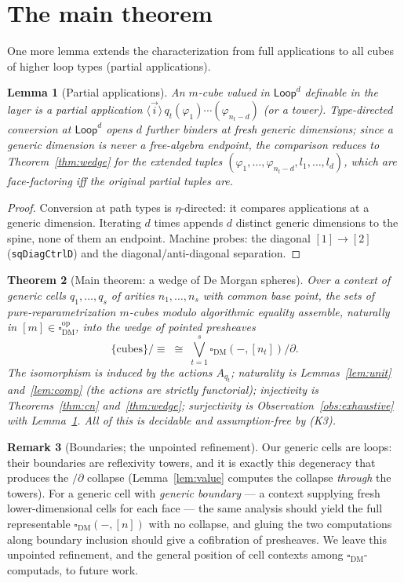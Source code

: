 \documentclass[11pt]{amsart}
\newtheorem{thm}{Theorem}[section]
\newtheorem{lem}[thm]{Lemma}
\theoremstyle{definition}
\newtheorem{rem}[thm]{Remark}
\newcommand{\Dbox}{\square_{\mathrm{DM}}}
\newcommand{\aconv}{\equiv}
\newcommand{\Loop}{\mathsf{Loop}}
\newcommand{\act}[1]{A_{#1}}
\begin{document}
\section{The main theorem}
\label{sec:main}

One more lemma extends the characterization from full applications
to all cubes of higher loop types (partial applications).

\begin{lem}[Partial applications]\label{lem:partial}
  An $m$-cube valued in $\Loop^d$ definable in the layer is a
  partial application $\langle \vec i \rangle\,
  q_t(\varphi_1)\cdots(\varphi_{n_t - d})$ (or a tower).
  Type-directed conversion at $\Loop^d$ opens $d$ further binders
  at fresh generic dimensions; since a generic dimension is never a
  free-algebra endpoint, the comparison reduces to
  Theorem~\ref{thm:wedge} for the extended tuples
  $(\varphi_1,\dots,\varphi_{n_t-d}, l_1, \dots, l_d)$, which are
  face-factoring iff the original partial tuples are.
\end{lem}
\begin{proof}
  Conversion at path types is $\eta$-directed: it compares
  applications at a generic dimension.  Iterating $d$ times appends
  $d$ distinct generic dimensions to the spine, none of them an
  endpoint.  Machine probes: the diagonal $[1] \to [2]$
  (\texttt{sqDiagCtrlD}) and the diagonal/anti-diagonal separation.
\end{proof}

\begin{thm}[Main theorem: a wedge of De Morgan spheres]
  \label{thm:main}
  Over a context of generic cells $q_1, \dots, q_s$ of arities
  $n_1, \dots, n_s$ with common base point, the sets of
  pure-reparametrization $m$-cubes modulo algorithmic equality
  assemble, naturally in $[m] \in \Dbox^{\mathrm{op}}$, into the
  wedge of pointed presheaves
  \[
    \{\text{cubes}\}/{\aconv} \;\cong\;
    \bigvee_{t=1}^{s} \Dbox(-,[n_t])/\partial .
  \]
  The isomorphism is induced by the actions $\act{q_t}$; naturality
  is Lemmas~\ref{lem:unit} and~\ref{lem:comp} (the actions are
  strictly functorial); injectivity is Theorems~\ref{thm:cn}
  and~\ref{thm:wedge}; surjectivity is
  Observation~\ref{obs:exhaustive} with Lemma~\ref{lem:partial}.
  All of this is decidable and assumption-free by (K3).
\end{thm}

\begin{rem}[Boundaries; the unpointed refinement]
  \label{rem:boundary}
  Our generic cells are loops: their boundaries are reflexivity
  towers, and it is exactly this degeneracy that produces the
  $/\partial$ collapse (Lemma~\ref{lem:value} computes the collapse
  \emph{through} the towers).  For a generic cell with \emph{generic
  boundary} --- a context supplying fresh lower-dimensional cells
  for each face --- the same analysis should yield the full
  representable $\Dbox(-,[n])$ with no collapse, and gluing the two
  computations along boundary inclusion should give a cofibration
  of presheaves.  We leave this unpointed refinement, and the
  general position of cell contexts among $\Dbox$-computads, to
  future work.
\end{rem}
\end{document}
